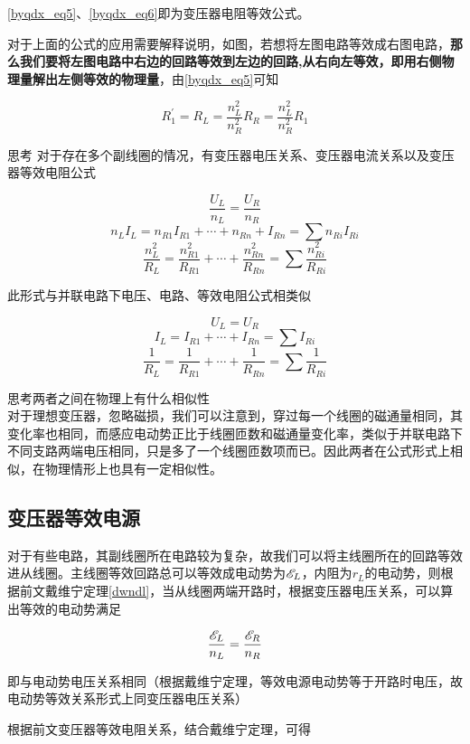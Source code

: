 \eqref{byqdx_eq5}、\eqref{byqdx_eq6}即为变压器电阻等效公式。



对于上面的公式的应用需要解释说明，如图，若想将左图电路等效成右图电路，\textbf{那么我们要将左图电路中右边的回路等效到左边的回路,从右向左等效，即用右侧物理量解出左侧等效的物理量}，由\eqref{byqdx_eq5}可知

$$R_1^{\prime} = R_L = \frac{n_L^2}{n_R^2} R_R = \frac{n_L^2}{n_R^2} R_1$$

\begin{mk}{思考}{}
对于存在多个副线圈的情况，有变压器电压关系、变压器电流关系以及变压器等效电阻公式

$$\frac{U_L}{n_L} = \frac{U_R}{n_R}$$
$$n_L I_L = n_{R1} I_{R1} + \cdots + n_{Rn} + I_{Rn} = \sum n_{Ri} I_{Ri}$$
$$\frac{n_{L}^2}{R_L} =\frac{n_{R1}^2}{R_{R1}} + \cdots + \frac{n_{Rn}^2}{R_{Rn}} = \sum \frac{n_{Ri}^2}{R_{Ri}}$$

此形式与并联电路下电压、电路、等效电阻公式相类似

$$U_L = U_R$$
$$I_L = I_{R1} + \cdots + I_{Rn} = \sum I_{Ri}$$
$$\frac{1}{R_L} = \frac{1}{R_{R1}} + \cdots + \frac{1}{R_{Rn}} = \sum \frac{1}{R_{Ri}}$$

思考两者之间在物理上有什么相似性
~\\

对于理想变压器，忽略磁损，我们可以注意到，穿过每一个线圈的磁通量相同，其变化率也相同，而感应电动势正比于线圈匝数和磁通量变化率，类似于并联电路下不同支路两端电压相同，只是多了一个线圈匝数项而已。因此两者在公式形式上相似，在物理情形上也具有一定相似性。
\end{mk}

\subsection{变压器等效电源}



对于有些电路，其副线圈所在电路较为复杂，故我们可以将主线圈所在的回路等效进从线圈。主线圈等效回路总可以等效成电动势为$\mathscr{E}_L$，内阻为$r_L$的电动势，则根据前文戴维宁定理\eqref{dwndl}，当从线圈两端开路时，根据变压器电压关系，可以算出等效的电动势满足

$$\frac{\mathscr{E}_L}{n_L} = \frac{\mathscr{E}_R}{n_R}$$

即与电动势电压关系相同（根据戴维宁定理，等效电源电动势等于开路时电压，故电动势等效关系形式上同变压器电压关系）

根据前文变压器等效电阻关系，结合戴维宁定理，可得

